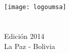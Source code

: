 \begin{titlepage}
	\begin{center}		
		\textsc{\huge {\myUniversity}}\\[0.5cm] 
		\textsc{\huge{\myFaculty}}\\[0.7cm]
		\textsc{\large{\myDepartment}}\\[0.5cm]
		\textsc{\large{\myGroup}}\\[2cm]
		\texttt{[image: logoumsa]}\\[2cm] 
		\textsc{\huge \myTitle}\\[1cm]			
		\textsc{\LARGE \mySubtitle}\\[2cm]
		{\Large Edición 2014}\\[1cm]	
		{\Large La Paz - Bolivia}\\[1cm]														
		\vfill
	\end{center}	
\end{titlepage}